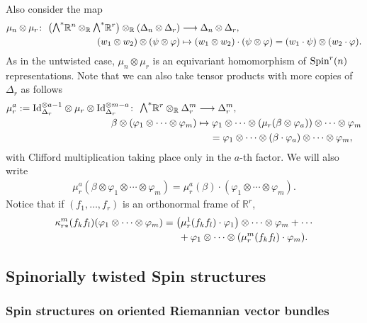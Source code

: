 \documentclass[10pt,a4paper]{amsart}
\newcommand{\ext}{\raise1pt\hbox{\small$\bigwedge$}}
\numberwithin{equation}{section}
\begin{document}
Also consider the map
\begin{align*}
 \mu_n\otimes\mu_r\colon \ \big(\ext^*\mathbb{R}^n\otimes_\mathbb{R} \ext^*\mathbb{R}^r\big) \otimes_\mathbb{R} (\Delta_n\otimes \Delta_r) &\longrightarrow \Delta_n\otimes\Delta_r,\\
(w_1 \otimes w_2)\otimes (\psi\otimes \varphi) &\mapsto (w_1\otimes w_2)\cdot (\psi\otimes \varphi)= (w_1\cdot\psi) \otimes (w_2\cdot \varphi).
\end{align*}
As in the untwisted case, $\mu_n\otimes\mu_r$ is an equivariant homomorphism of ${\rm Spin}^r(n)$ representations. Note that we can also take tensor products with more copies of $\Delta_r$ as follows
\begin{align*}
\mu_r^a:= {\rm Id}_{\Delta_r}^{\otimes a-1}\otimes \mu_r\otimes {\rm Id}_{\Delta_r}^{\otimes m-a}\colon \
\ext^*\mathbb{R}^r
 \otimes_\mathbb{R} \Delta_r^{m} &\longrightarrow \Delta_r^{m},\\
\beta\otimes ( \varphi_1\otimes\cdots\otimes \varphi_{m}) &\mapsto \varphi_1\otimes\cdots\otimes (\mu_r(\beta\otimes\varphi_a))\otimes\cdots\otimes\varphi_{m}\\
& \hphantom{\mapsto}{} \ = \varphi_1\otimes\cdots\otimes (\beta\cdot\varphi_a)\otimes\cdots\otimes \varphi_{m},
\end{align*}
with Clifford multiplication taking place only in the $a$-th factor. We will also write
\begin{gather*}
\mu_r^a(\beta\otimes \varphi_1\otimes\cdots\otimes \varphi_{m})
 = \mu_r^a(\beta)\cdot (\varphi_1\otimes\cdots\otimes \varphi_{m}) .
\end{gather*}
Notice that if $(f_1,\dots,f_r)$ is an orthonormal frame of $\mathbb{R}^r$,
\begin{gather}
\kappa_{r*}^m(f_kf_l) (\varphi_1\otimes\cdots \otimes\varphi_m)=
\big(\mu_r^1(f_kf_l)\cdot\varphi_1\big)\otimes\cdots \otimes\varphi_m +\cdots\nonumber\\
\hphantom{\kappa_{r*}^m(f_kf_l) (\varphi_1\otimes\cdots \otimes\varphi_m)=}{} + \varphi_1\otimes\cdots \otimes(\mu_r^m(f_kf_l)\cdot\varphi_m).\label{kappa-en-mus}
\end{gather}

\subsection{Spinorially twisted Spin structures}

\subsubsection{Spin structures on oriented Riemannian vector bundles}
\end{document}
